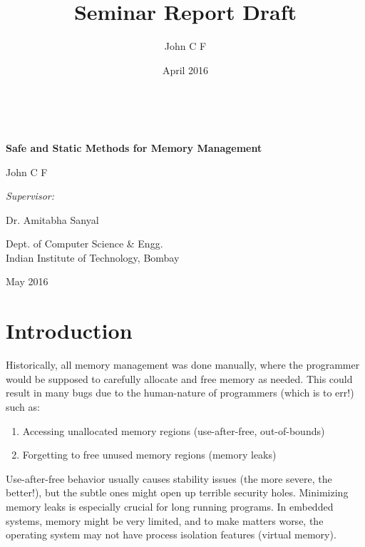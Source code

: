 \documentclass[11pt]{report}
\title{Seminar Report Draft}
\author{John C F}
\date{April 2016}
\begin{document}
\begin{titlepage}
    \begin{center}
        ~\par {}
        {\LARGE \bfseries Safe and Static Methods for Memory Management \par}

        {\large John C F\par}

        {\large \em {} Supervisor:\par}\vspace{.5\baselineskip}
        {\large Dr. Amitabha Sanyal \par}

        {\large Dept. of Computer Science \& Engg.\\[0.5\baselineskip]
            Indian Institute of Technology, Bombay \par}

        {\large May 2016}
    \end{center}
\end{titlepage}

\tableofcontents

\chapter{Introduction}

Historically, all memory management was done manually, where the programmer would be supposed to carefully allocate and free memory as needed. This could result in many bugs due to the human-nature of programmers (which is to err!) such as:

\begin{enumerate}
\item Accessing unallocated memory regions (use-after-free, out-of-bounds)
\item Forgetting to free unused memory regions (memory leaks)
\end{enumerate}

Use-after-free behavior usually causes stability issues (the more severe, the better!), but the subtle ones might open up terrible security holes. Minimizing memory leaks is especially crucial for long running programs. In embedded systems, memory might be very limited, and to make matters worse, the operating system may not have process isolation features (virtual memory).
\end{document}
